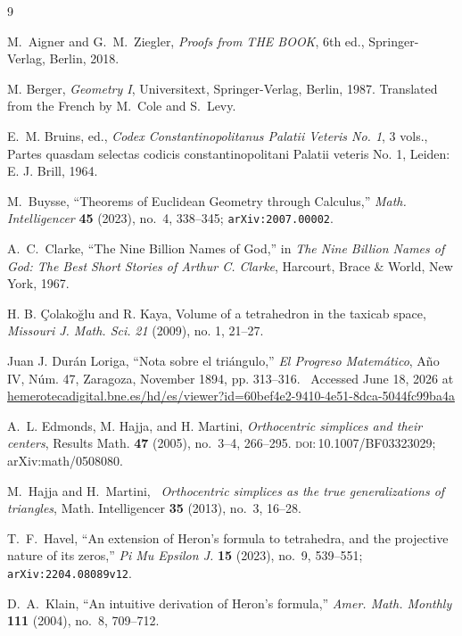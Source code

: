 \documentclass[10.5pt]
{amsart}
\begin{document}
\begin{thebibliography}{9}

M.~Aigner and G.~M.~Ziegler,
\textit{Proofs from THE BOOK}, 6th ed.,
Springer-Verlag, Berlin, 2018.

M. Berger,
\emph{Geometry I},
Universitext, Springer-Verlag, Berlin, 1987.
Translated from the French by M.~Cole and S.~Levy.


E.~M. Bruins, ed.,
\emph{Codex Constantinopolitanus Palatii Veteris No. 1},
3 vols., Partes quasdam selectas codicis constantinopolitani Palatii veteris No. 1,
Leiden: E. J. Brill, 1964.

M.~Buysse,
``Theorems of Euclidean Geometry through Calculus,''
\textit{Math. Intelligencer} \textbf{45} (2023), no.~4, 338--345;
\texttt{arXiv:2007.00002}.

A.~C.~Clarke,
``The Nine Billion Names of God,''
in \textit{The Nine Billion Names of God: The Best Short Stories of Arthur C. Clarke},
Harcourt, Brace \& World, New York, 1967.

H. B. \c{C}olako\u{g}lu and R. Kaya, Volume of a tetrahedron in the taxicab space, {\it Missouri J. Math. Sci.} {\it 21} (2009), no. 1, 21--27.

Juan J. Dur\'an Loriga,
``Nota sobre el tri\'angulo,''
\emph{El Progreso Matem\'atico}, A\~no IV, N\'um. 47,
Zaragoza, November 1894, pp. 313--316. \,
Accessed June 18, 2026 at 
{\scriptsize \url{
hemerotecadigital.bne.es/hd/es/viewer?id=60bef4e2-9410-4e51-8dca-5044fc99ba4a}}

A.~L. Edmonds, M. Hajja, and H. Martini,
\emph{Orthocentric simplices and their centers},
Results Math. \textbf{47} (2005), no.~3--4, 266--295.
\textsc{doi:}\,10.1007/BF03323029; arXiv:math/0508080.


  M.~Hajja and H.~Martini,
\  \emph{Orthocentric simplices as the true generalizations of triangles},
  Math. Intelligencer \textbf{35} (2013), no.~3, 16--28.

T.~F.~Havel,
``An extension of Heron's formula to tetrahedra, and the projective nature of its zeros,''
\textit{Pi Mu Epsilon J.} \textbf{15} (2023), no.~9, 539--551;
\texttt{arXiv:2204.08089v12}.

D.~A.~Klain,
``An intuitive derivation of Heron's formula,''
\textit{Amer. Math. Monthly} \textbf{111} (2004), no.~8, 709--712.


\end{thebibliography}
\end{document}
